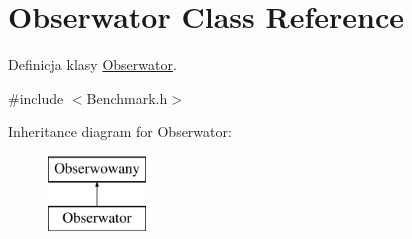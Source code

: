 \hypertarget{class_obserwator}{\section{Obserwator Class Reference}
\label{class_obserwator}
}


Definicja klasy \hyperlink{class_obserwator}{Obserwator}.  




{\ttfamily \#include $<$Benchmark.\-h$>$}

Inheritance diagram for Obserwator\-:\begin{figure}[H]
\begin{center}
\leavevmode
\includegraphics[height=2.000000cm]{class_obserwator}
\end{center}
\end{figure}
